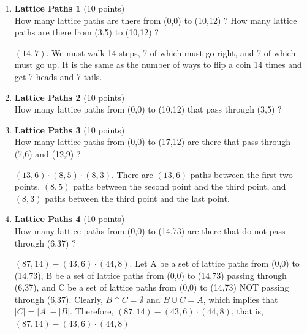 \begin{enumerate}
  \newpage



  \item \textbf{Lattice Paths 1} (10 points)\\
  How many lattice paths are there from (0,0) to (10,12) ?
  How many lattice paths are there from (3,5) to (10,12) ?
  \begin{subanswer}
    $(14,7)$. We must walk 14 steps, 7 of which must go right, and 7 of which must go up. It is the same as the number of ways to flip a coin 14 times and get 7 heads and 7 tails.
  \end{subanswer}

  \item \textbf{Lattice Paths 2} (10 points)\\
  How many lattice paths from (0,0) to (10,12) that pass through (3,5) ?
  \begin{subanswer}
  \end{subanswer}

  \item \textbf{Lattice Paths 3} (10 points)\\
  How many lattice paths from (0,0) to (17,12) are there that pass through (7,6) and (12,9) ?
  \begin{subanswer}
    $(13,6) \cdot (8,5) \cdot (8,3)$. There are $(13,6)$ paths between the first two points, $(8,5)$ paths between the second point and the third point, and $(8,3)$ paths between the third point and the last point.
  \end{subanswer}

  \item \textbf{Lattice Paths 4} (10 points)\\
  How many lattice paths from (0,0) to (14,73) are there that do not pass through (6,37) ?
  \begin{subanswer}
    $(87,14)-(43,6) \cdot (44,8)$. Let A be a set of lattice paths from (0,0) to (14,73), B be a set of lattice paths from (0,0) to (14,73) passing through (6,37), and C be a set of lattice paths from (0,0) to (14,73) NOT passing through (6,37).
    Clearly, $B \cap C = \emptyset$ and $B \cup C = A$, which implies that $|C|=|A|-|B|$.
    Therefore, $(87,14)-(43,6) \cdot (44,8)$, that is, $(87,14)-(43,6) \cdot (44,8)$
  \end{subanswer}


\end{enumerate}
